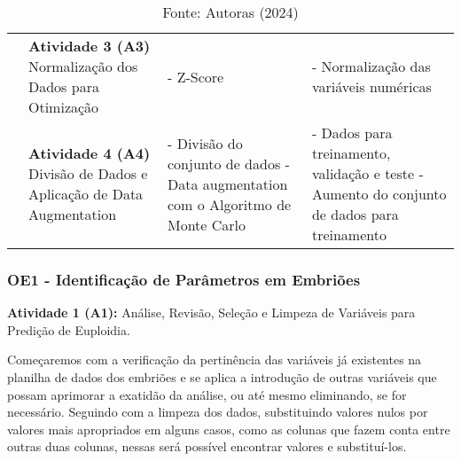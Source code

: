 \begin{table}[h!]
{\begin{tabular}{|p{3cm}|p{4cm}|p{3cm}|p{5cm}|}
      \cline{2-4}

      \cellcolor[HTML]{133e78} & 
      \textcolor[HTML]{133E78}{\textbf{Atividade 3 (A3)}} \newline
      Normalização dos Dados para Otimização &
      - Z-Score &
      - Normalização das variáveis numéricas \\

      \cline{2-4}

      \cellcolor[HTML]{133e78} & 
      \vspace{0.2cm} \textcolor[HTML]{133E78}{\textbf{Atividade 4 (A4)}} \newline
      Divisão de Dados e Aplicação de Data Augmentation \vspace{0.2cm} & 
      - Divisão do conjunto de dados \newline
      - Data augmentation com o Algoritmo de Monte Carlo &
      - Dados para treinamento, validação e teste \newline
      - Aumento do conjunto de dados para treinamento \\

      \hline
    \end{tabular}
  }
  \caption*{\scriptsize Fonte: Autoras (2024)}
\end{table} 
\FloatBarrier  %

\subsubsection{OE1 - Identificação de Parâmetros em Embriões}

\textbf{Atividade 1 (A1):} Análise, Revisão, Seleção e Limpeza de Variáveis para Predição de Euploidia.

Começaremos com a verificação da pertinência das variáveis já existentes na planilha de dados dos embriões e se aplica a introdução de outras variáveis que possam aprimorar a exatidão da análise, ou até mesmo eliminando, se for necessário. Seguindo com a limpeza dos dados, substituindo valores nulos por valores mais apropriados em alguns casos, como as colunas que fazem conta entre outras duas colunas, nessas será possível encontrar valores e substituí-los.

